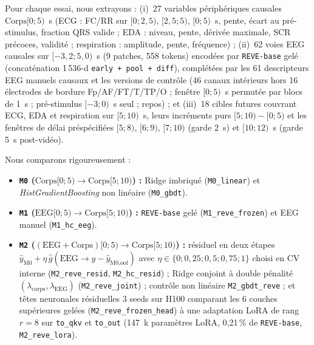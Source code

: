 \documentclass[10pt]{article}
\begin{document}
Pour chaque essai, nous extrayons : (i)~27 variables périphériques causales $\text{Corps}[0 ; 5)$~s (ECG : FC/RR sur $[0 ; 2{,}5)$, $[2{,}5 ; 5)$, $[0 ; 5)$~s, pente, écart au pré-stimulus, fraction QRS valide ; EDA : niveau, pente, dérivée maximale, SCR précoces, validité ; respiration : amplitude, pente, fréquence) ; (ii)~62 voies EEG causales sur $[-3{,}2 ; 5{,}0)$~s (9 patches, 558 tokens) encodées par \texttt{REVE-base} gelé (concaténation 1\,536-d \texttt{early + pool + diff}), complétées par les 61 descripteurs EEG manuels causaux et les versions de contrôle (46 canaux intérieurs hors 16 électrodes de bordure Fp/AF/FT/T/TP/O ; fenêtre $[0 ; 5)$~s permutée par blocs de 1~s ; pré-stimulus $[-3 ; 0)$~s seul ; repos) ; et (iii)~18 cibles futures couvrant ECG, EDA et respiration sur $[5 ; 10)$~s, leurs incréments purs $[5 ; 10) - [0 ; 5)$ et les fenêtres de délai préspécifiées $[5 ; 8)$, $[6 ; 9)$, $[7 ; 10)$ (garde 2~s) et $[10 ; 12)$~s (garde 5~s post-vidéo).

Nous comparons rigoureusement :
\begin{itemize}
\item \textbf{\texttt{M0} ($\text{Corps}[0 ; 5) \to \text{Corps}[5 ; 10)$) :} Ridge imbriqué (\texttt{M0\_linear}) et \emph{HistGradientBoosting} non linéaire (\texttt{M0\_gbdt}).
\item \textbf{\texttt{M1} ($\text{EEG}[0 ; 5) \to \text{Corps}[5 ; 10)$) :} \texttt{REVE-base} gelé (\texttt{M1\_reve\_frozen}) et EEG manuel (\texttt{M1\_hc\_eeg}).
\item \textbf{\texttt{M2} ($(\text{EEG}+\text{Corps})[0 ; 5) \to \text{Corps}[5 ; 10)$) :} résiduel en deux étapes $\hat{y}_{\text{M0}} + \eta\,\hat{g}(\text{EEG} \to y - \hat{y}_{\text{M0,oof}})$ avec $\eta \in \{0 ; 0{,}25 ; 0{,}5 ; 0{,}75 ; 1\}$ choisi en CV interne (\texttt{M2\_reve\_resid}, \texttt{M2\_hc\_resid}) ; Ridge conjoint à double pénalité $(\lambda_{\text{corps}}, \lambda_{\text{EEG}})$ (\texttt{M2\_reve\_joint}) ; contrôle non linéaire \texttt{M2\_gbdt\_reve} ; et têtes neuronales résiduelles 3 seeds sur H100 comparant les 6 couches supérieures gelées (\texttt{M2\_reve\_frozen\_head}) à une adaptation LoRA de rang $r = 8$ sur \texttt{to\_qkv} et \texttt{to\_out} (147~k paramètres LoRA, 0,21\,\% de \texttt{REVE-base}, \texttt{M2\_reve\_lora}).
\end{itemize}
\end{document}
